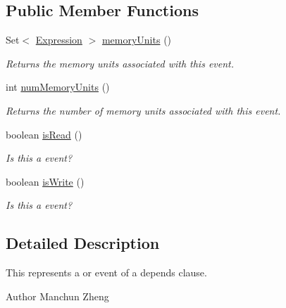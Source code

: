 \subsection*{Public Member Functions}
\begin{DoxyCompactItemize}
\item 
Set$<$ \hyperlink{interfaceedu_1_1udel_1_1cis_1_1vsl_1_1civl_1_1model_1_1IF_1_1expression_1_1Expression}{Expression} $>$ \hyperlink{interfaceedu_1_1udel_1_1cis_1_1vsl_1_1civl_1_1model_1_1IF_1_1contract_1_1ReadOrWriteEvent_a57833c73dd906ee5c61a031552d578c7}{memory\+Units} ()
\begin{DoxyCompactList}\small\item\em Returns the memory units associated with this event. \end{DoxyCompactList}\item 
int \hyperlink{interfaceedu_1_1udel_1_1cis_1_1vsl_1_1civl_1_1model_1_1IF_1_1contract_1_1ReadOrWriteEvent_a45fddf59800ffb9f52c63fa5a8a70d17}{num\+Memory\+Units} ()
\begin{DoxyCompactList}\small\item\em Returns the number of memory units associated with this event. \end{DoxyCompactList}\item 
boolean \hyperlink{interfaceedu_1_1udel_1_1cis_1_1vsl_1_1civl_1_1model_1_1IF_1_1contract_1_1ReadOrWriteEvent_a8f14924f3bfd304442733cb2445d8996}{is\+Read} ()
\begin{DoxyCompactList}\small\item\em Is this a {\ttfamily } event? \end{DoxyCompactList}\item 
boolean \hyperlink{interfaceedu_1_1udel_1_1cis_1_1vsl_1_1civl_1_1model_1_1IF_1_1contract_1_1ReadOrWriteEvent_ad8153c36ea52f52cd3ee35c9fbe73fdd}{is\+Write} ()
\begin{DoxyCompactList}\small\item\em Is this a {\ttfamily } event? \end{DoxyCompactList}\end{DoxyCompactItemize}


\subsection{Detailed Description}
This represents a {\ttfamily } or {\ttfamily } event of a {\ttfamily depends} clause. 

\begin{DoxyAuthor}{Author}
Manchun Zheng 
\end{DoxyAuthor}


